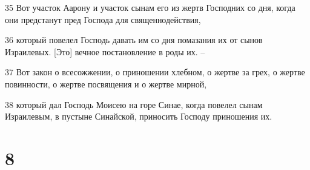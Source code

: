 \par 35 Вот участок Аарону и участок сынам его из жертв Господних со дня, когда они предстанут пред Господа для священнодействия,
\par 36 который повелел Господь давать им со дня помазания их от сынов Израилевых. [Это] вечное постановление в роды их. --
\par 37 Вот закон о всесожжении, о приношении хлебном, о жертве за грех, о жертве повинности, о жертве посвящения и о жертве мирной,
\par 38 который дал Господь Моисею на горе Синае, когда повелел сынам Израилевым, в пустыне Синайской, приносить Господу приношения их.

\chapter{8}

